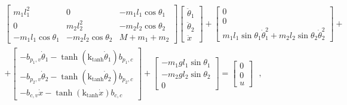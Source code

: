%
%
\begingroup\makeatletter{}\check@mathfonts
\def\maketag@@@#1{\hbox{\m@th\normalsize\normalfont#1}}%
\begin{align}
  \begin{split}
    &
    \begin{bmatrix}
      m_1 l_1^2              & 0                       &  -m_1 l_1 \cos \theta_1 \\
      0                      & m_2 l_2^2               &  -m_2 l_2 \cos \theta_2\\
      -m_1 l_1 \cos \theta_1 & -m_2 l_2 \cos \theta_2  &  M + m_1 + m_2
    \end{bmatrix}
    \begin{bmatrix}
      \ddot{\theta}_1  \\
      \ddot{\theta}_2  \\
      \ddot{x}
    \end{bmatrix}
    +
    \begin{bmatrix}
    0  \\
    0  \\
    m_1 l_1 \sin \theta_1 \dot{\theta}_1^2 + m_2 l_2 \sin \theta_2 \dot{\theta}_2^2
    \end{bmatrix}
    +   \\
    &+
    \begin{bmatrix}
      -b_{p_1,v} \dot{\theta}_1 - \tanh(\text{k}_\text{tanh}\dot{\theta}_1) b_{p_1,c}    \\
      -b_{p_2,v} \dot{\theta}_2 - \tanh(\text{k}_\text{tanh}\dot{\theta}_2) b_{p_2,c}    \\
      -b_{c,v} \dot{x} - \tanh(\text{k}_\text{tanh}\dot{x}) b_{c,c}
    \end{bmatrix}
    +
    \begin{bmatrix}
      -m_1 g l_1 \sin \theta_1  \\
      -m_2 g l_2 \sin \theta_2  \\
      0
    \end{bmatrix}
    =
    \begin{bmatrix}
      0  \\
      0  \\
      u
    \end{bmatrix} \ \ \ , 
  \end{split}
  \label{eq:theta1Theta2Xdynamics} \\ \nonumber
\end{align}
\endgroup \vspace{-36pt}

